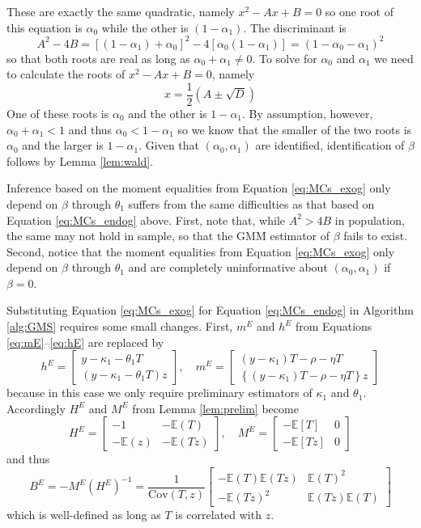 These are exactly the same quadratic, namely $x^2 - Ax + B = 0$ so one root of this equation is $\alpha_0$ while the other is $(1 - \alpha_1)$.
The discriminant is
\[
  A^2 - 4 B = \left[ (1 - \alpha_1) + \alpha_0 \right]^2 - 4\left[ \alpha_0 (1 - \alpha_1) \right] = (1 - \alpha_0 - \alpha_1)^2
\]
so that both roots are real as long as $\alpha_0 + \alpha_1 \neq 0$.
To solve for $\alpha_0$ and $\alpha_1$ we need to calculate the roots of $x^2 - Ax + B =0$, namely
\[
  x = \frac{1}{2}\left( A \pm \sqrt{D} \right)
\]
One of these roots is $\alpha_0$ and the other is $1 - \alpha_1$.
By assumption, however, $\alpha_0 + \alpha_1 < 1$ and thus $\alpha_0 < 1 - \alpha_1$ so we know that the smaller of the two roots is $\alpha_0$ and the larger is $1 - \alpha_1$.
Given that $(\alpha_0, \alpha_1)$ are identified, identification of $\beta$ follows by Lemma \ref{lem:wald}.

Inference based on the moment equalities from Equation \ref{eq:MCs_exog} only depend on $\beta$ through $\theta_1$ suffers from the same difficulties as that based on Equation \ref{eq:MCs_endog} above.
First, note that, while $A^2 > 4B$ in population, the same may not hold in sample, so that the GMM estimator of $\beta$ fails to exist.
Second, notice that the moment equalities from Equation \ref{eq:MCs_exog} only depend on $\beta$ through $\theta_1$ and are completely uninformative about $(\alpha_0, \alpha_1)$ if $\beta = 0$.

Substituting Equation \ref{eq:MCs_exog} for Equation \ref{eq:MCs_endog} in Algorithm \ref{alg:GMS} requires some small changes.
First, $m^E$ and $h^E$ from Equations \ref{eq:mE}--\ref{eq:hE} are replaced by 
\[
 h^E = \left[
 \begin{array}{c}
   y - \kappa_1 - \theta_1 T \\
   (y - \kappa_1 - \theta_1 T) z
 \end{array}
 \right], \quad
  m^E = \left[
  \begin{array}{c}
    (y - \kappa_1)T - \rho - \eta T\\
    \left\{(y - \kappa_1)T - \rho - \eta T\right\}z
  \end{array}
\right]
\]
because in this case we only require preliminary estimators of $\kappa_1$ and $\theta_1$.
Accordingly $H^E$ and $M^E$ from Lemma \ref{lem:prelim} become
\[
  H^E = \left[
\begin{array}{cc}
  -1 & -\mathbb{E}(T)\\
  -\mathbb{E}(z) & -\mathbb{E}(Tz)
\end{array}
\right], \quad
  M^E = \left[
\begin{array}{cc}
  -\mathbb{E}[T] & 0 \\
  -\mathbb{E}[Tz] & 0
\end{array}
\right]
\]
and thus
\[
  B^E = -M^E (H^E)^{-1} = 
\frac{1}{\mbox{Cov}(T,z)} \left[
\begin{array}{cc}
  -\mathbb{E}(T)\mathbb{E}(Tz) & \mathbb{E}(T)^2 \\
  -\mathbb{E}(Tz)^2 & \mathbb{E}(Tz) \mathbb{E}(T)
\end{array}
\right]
\]
which is well-defined as long as $T$ is correlated with $z$.

